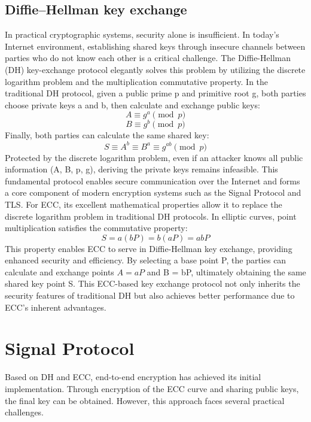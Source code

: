 \documentclass[9pt,a4paper,twoside]{rho-class/rho}
\begin{document}
\subsection{Diffie–Hellman key exchange}
In practical cryptographic systems, security alone is insufficient. In today's Internet environment, establishing shared keys through insecure channels between parties who do not know each other is a critical challenge. The Diffie-Hellman (DH) key-exchange protocol elegantly solves this problem by utilizing the discrete logarithm problem and the multiplication commutative property. In the traditional DH protocol, given a public prime p and primitive root g, both parties choose private keys a and b, then calculate and exchange public keys:
$$ A \equiv g^a \pmod{p} $$
$$ B \equiv g^b \pmod{p} $$
Finally, both parties can calculate the same shared key:
$$ S \equiv A^b \equiv B^a \equiv g^{ab} \pmod{p} $$
Protected by the discrete logarithm problem, even if an attacker knows all public information (A, B, p, g), deriving the private keys remains infeasible. This fundamental protocol enables secure communication over the Internet and forms a core component of modern encryption systems such as the Signal Protocol and TLS.
For ECC, its excellent mathematical properties allow it to replace the discrete logarithm problem in traditional DH protocols. In elliptic curves, point multiplication satisfies the commutative property:
$$ S = a(bP) = b(aP) = abP $$
This property enables ECC to serve in Diffie-Hellman key exchange, providing enhanced security and efficiency. By selecting a base point P, the parties can calculate and exchange points $A = aP$ and B = bP, ultimately obtaining the same shared key point S. This ECC-based key exchange protocol not only inherits the security features of traditional DH but also achieves better performance due to ECC's inherent advantages.

\section{Signal Protocol}
Based on DH and ECC, end-to-end encryption has achieved its initial implementation. Through encryption of the ECC curve and sharing public keys, the final key can be obtained. However, this approach faces several practical challenges. 
\end{document}
